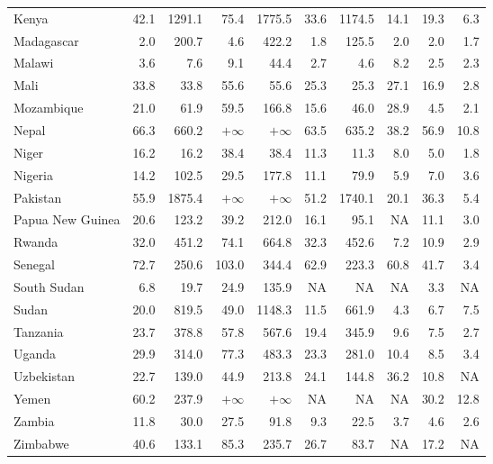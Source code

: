 \begin{table}[b]
{\begin{tabular}[t]{lrrrrrrrrr}
Kenya & 42.1 & 1291.1 & 75.4 & 1775.5 & 33.6 & 1174.5 & 14.1 & 19.3 & 6.3\\
Madagascar & 2.0 & 200.7 & 4.6 & 422.2 & 1.8 & 125.5 & 2.0 & 2.0 & 1.7\\
Malawi & 3.6 & 7.6 & 9.1 & 44.4 & 2.7 & 4.6 & 8.2 & 2.5 & 2.3\\
Mali & 33.8 & 33.8 & 55.6 & 55.6 & 25.3 & 25.3 & 27.1 & 16.9 & 2.8\\
Mozambique & 21.0 & 61.9 & 59.5 & 166.8 & 15.6 & 46.0 & 28.9 & 4.5 & 2.1\\
Nepal & 66.3 & 660.2 & $+\infty$ & $+\infty$ & 63.5 & 635.2 & 38.2 & 56.9 & 10.8\\
Niger & 16.2 & 16.2 & 38.4 & 38.4 & 11.3 & 11.3 & 8.0 & 5.0 & 1.8\\
Nigeria & 14.2 & 102.5 & 29.5 & 177.8 & 11.1 & 79.9 & 5.9 & 7.0 & 3.6\\
Pakistan & 55.9 & 1875.4 & $+\infty$ & $+\infty$ & 51.2 & 1740.1 & 20.1 & 36.3 & 5.4\\
Papua New Guinea & 20.6 & 123.2 & 39.2 & 212.0 & 16.1 & 95.1 & NA & 11.1 & 3.0\\
Rwanda & 32.0 & 451.2 & 74.1 & 664.8 & 32.3 & 452.6 & 7.2 & 10.9 & 2.9\\
Senegal & 72.7 & 250.6 & 103.0 & 344.4 & 62.9 & 223.3 & 60.8 & 41.7 & 3.4\\
South Sudan & 6.8 & 19.7 & 24.9 & 135.9 & NA & NA & NA & 3.3 & NA\\
Sudan & 20.0 & 819.5 & 49.0 & 1148.3 & 11.5 & 661.9 & 4.3 & 6.7 & 7.5\\
Tanzania & 23.7 & 378.8 & 57.8 & 567.6 & 19.4 & 345.9 & 9.6 & 7.5 & 2.7\\
Uganda & 29.9 & 314.0 & 77.3 & 483.3 & 23.3 & 281.0 & 10.4 & 8.5 & 3.4\\
Uzbekistan & 22.7 & 139.0 & 44.9 & 213.8 & 24.1 & 144.8 & 36.2 & 10.8 & NA\\
Yemen & 60.2 & 237.9 & $+\infty$ & $+\infty$ & NA & NA & NA & 30.2 & 12.8\\
Zambia & 11.8 & 30.0 & 27.5 & 91.8 & 9.3 & 22.5 & 3.7 & 4.6 & 2.6\\
Zimbabwe & 40.6 & 133.1 & 85.3 & 235.7 & 26.7 & 83.7 & NA & 17.2 & NA\\
\bottomrule
\end{tabular}}
\end{table}